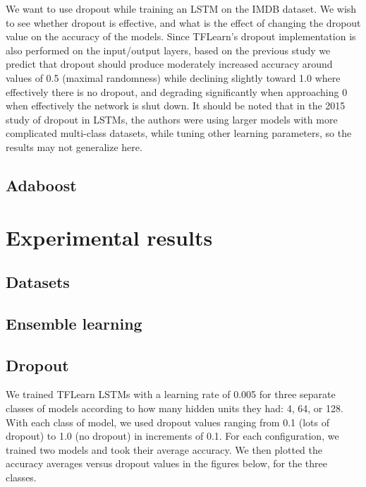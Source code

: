 \documentclass[a4paper,12pt]{article}
\begin{document}
We want to use dropout while training an LSTM on the IMDB dataset. We wish to see whether dropout is effective, and what is the effect of changing the dropout value on the accuracy of the models. Since TFLearn's dropout implementation is also performed on the input/output layers, based on the previous study we predict that dropout should produce moderately increased accuracy around values of 0.5 (maximal randomness) while declining slightly toward 1.0 where effectively there is no dropout, and degrading significantly when approaching 0 when effectively the network is shut down. It should be noted that in the 2015 study of dropout in LSTMs, the authors were using larger models with more complicated multi-class datasets, while tuning other learning parameters, so the results may not generalize here.

\subsection{Adaboost}




\section{Experimental results}

\subsection{Datasets}

\subsection{Ensemble learning}

\subsection{Dropout}
We trained TFLearn LSTMs with a learning rate of 0.005 for three separate classes of models according to how many hidden units they had: 4, 64, or 128. With each class of model, we used dropout values ranging from 0.1 (lots of dropout) to 1.0 (no dropout) in increments of 0.1. For each configuration, we trained two models and took their average accuracy. We then plotted the accuracy averages versus dropout values in the figures below, for the three classes.
\end{document}
